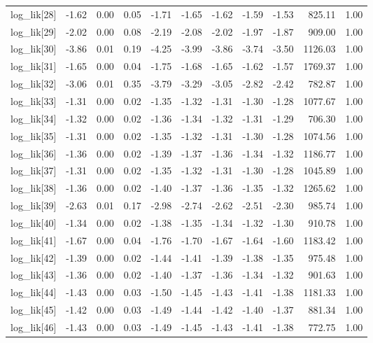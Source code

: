 \begin{table}[ht]
\begin{tabular}{rrrrrrrrrrr}
  log\_lik[28] & -1.62 & 0.00 & 0.05 & -1.71 & -1.65 & -1.62 & -1.59 & -1.53 & 825.11 & 1.00 \\ 
  log\_lik[29] & -2.02 & 0.00 & 0.08 & -2.19 & -2.08 & -2.02 & -1.97 & -1.87 & 909.00 & 1.00 \\ 
  log\_lik[30] & -3.86 & 0.01 & 0.19 & -4.25 & -3.99 & -3.86 & -3.74 & -3.50 & 1126.03 & 1.00 \\ 
  log\_lik[31] & -1.65 & 0.00 & 0.04 & -1.75 & -1.68 & -1.65 & -1.62 & -1.57 & 1769.37 & 1.00 \\ 
  log\_lik[32] & -3.06 & 0.01 & 0.35 & -3.79 & -3.29 & -3.05 & -2.82 & -2.42 & 782.87 & 1.00 \\ 
  log\_lik[33] & -1.31 & 0.00 & 0.02 & -1.35 & -1.32 & -1.31 & -1.30 & -1.28 & 1077.67 & 1.00 \\ 
  log\_lik[34] & -1.32 & 0.00 & 0.02 & -1.36 & -1.34 & -1.32 & -1.31 & -1.29 & 706.30 & 1.00 \\ 
  log\_lik[35] & -1.31 & 0.00 & 0.02 & -1.35 & -1.32 & -1.31 & -1.30 & -1.28 & 1074.56 & 1.00 \\ 
  log\_lik[36] & -1.36 & 0.00 & 0.02 & -1.39 & -1.37 & -1.36 & -1.34 & -1.32 & 1186.77 & 1.00 \\ 
  log\_lik[37] & -1.31 & 0.00 & 0.02 & -1.35 & -1.32 & -1.31 & -1.30 & -1.28 & 1045.89 & 1.00 \\ 
  log\_lik[38] & -1.36 & 0.00 & 0.02 & -1.40 & -1.37 & -1.36 & -1.35 & -1.32 & 1265.62 & 1.00 \\ 
  log\_lik[39] & -2.63 & 0.01 & 0.17 & -2.98 & -2.74 & -2.62 & -2.51 & -2.30 & 985.74 & 1.00 \\ 
  log\_lik[40] & -1.34 & 0.00 & 0.02 & -1.38 & -1.35 & -1.34 & -1.32 & -1.30 & 910.78 & 1.00 \\ 
  log\_lik[41] & -1.67 & 0.00 & 0.04 & -1.76 & -1.70 & -1.67 & -1.64 & -1.60 & 1183.42 & 1.00 \\ 
  log\_lik[42] & -1.39 & 0.00 & 0.02 & -1.44 & -1.41 & -1.39 & -1.38 & -1.35 & 975.48 & 1.00 \\ 
  log\_lik[43] & -1.36 & 0.00 & 0.02 & -1.40 & -1.37 & -1.36 & -1.34 & -1.32 & 901.63 & 1.00 \\ 
  log\_lik[44] & -1.43 & 0.00 & 0.03 & -1.50 & -1.45 & -1.43 & -1.41 & -1.38 & 1181.33 & 1.00 \\ 
  log\_lik[45] & -1.42 & 0.00 & 0.03 & -1.49 & -1.44 & -1.42 & -1.40 & -1.37 & 881.34 & 1.00 \\ 
  log\_lik[46] & -1.43 & 0.00 & 0.03 & -1.49 & -1.45 & -1.43 & -1.41 & -1.38 & 772.75 & 1.00 \\ 

\end{tabular}
\end{table}
